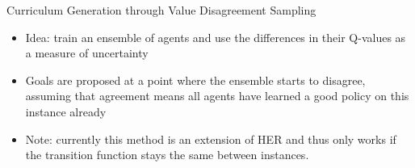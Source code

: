 \documentclass[aspectratio=169]{../latex_main/tntbeamer}  %
\begin{document}
\begin{frame}[c]{Curriculum Generation through Value Disagreement Sampling~}
	
	\begin{itemize}
		\item Idea: train an ensemble of agents and use the differences in their Q-values as a measure of uncertainty
		\item Goals are proposed at a point where the ensemble starts to disagree, assuming that agreement means all agents have learned a good policy on this instance already
		\item Note: currently this method is an extension of HER and thus only works if the transition function stays the same between instances. 
	\end{itemize}
	
\end{frame}
\end{document}
